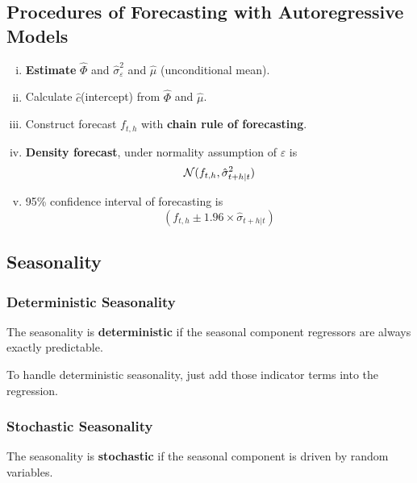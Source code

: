 \documentclass[11pt]{article}
\begin{document}
		\subsection{Procedures of Forecasting with Autoregressive Models}
			\begin{enumerate}[(i)]
				\item \textbf{Estimate} $\hat{\Phi}$ and $\hat{\sigma}_\varepsilon^2$ and $\hat{\mu}$ (unconditional mean). 
				\item Calculate $\hat{c}$(intercept) from $\hat{\Phi}$ and $\hat{\mu}$.
				\item Construct forecast $f_{t, h}$ with \textbf{chain rule of forecasting}.
				\item \textbf{Density forecast}, under normality assumption of $\varepsilon$ is
				\begin{equation}
					\mathcal{{N}}(f_{t,h}, \hat{\sigma}^2_{t+h|t})
				\end{equation}
				\item 95\% confidence interval of forecasting is
				\begin{equation}
					(f_{t,h} \pm 1.96 \times \hat{\sigma}_{t+h|t})
				\end{equation}
			\end{enumerate}
		
		\subsection{Seasonality}
			\subsubsection{Deterministic Seasonality}
				\begin{definition}
					The seasonality is \textbf{deterministic} if the seasonal component regressors are always exactly predictable.
				\end{definition}
				
				\begin{remark}
					To handle deterministic seasonality, just add those indicator terms into the regression.
				\end{remark}
				
			\subsubsection{Stochastic Seasonality}
				\begin{definition}
					The seasonality is \textbf{stochastic} if the seasonal component is driven by random variables.
				\end{definition}
				
\end{document}
